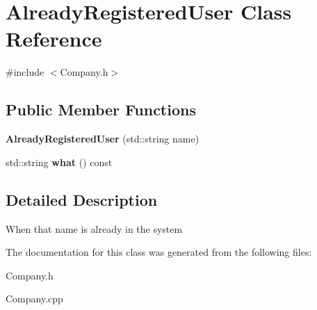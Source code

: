 \hypertarget{class_already_registered_user}{}\section{Already\+Registered\+User Class Reference}
\label{class_already_registered_user}


{\ttfamily \#include $<$Company.\+h$>$}

\subsection*{Public Member Functions}
\begin{DoxyCompactItemize}
\item 
\mbox{\label{class_already_registered_user_a8daf190044233235e28f8c53e922fabd}} 
{\bfseries Already\+Registered\+User} (std\+::string name)
\item 
\mbox{\label{class_already_registered_user_ae9f46091d164347cc12e45591d86d5a5}} 
std\+::string {\bfseries what} () const
\end{DoxyCompactItemize}


\subsection{Detailed Description}
When that name is already in the system 

The documentation for this class was generated from the following files\+:\begin{DoxyCompactItemize}
\item 
Company.\+h\item 
Company.\+cpp\end{DoxyCompactItemize}
